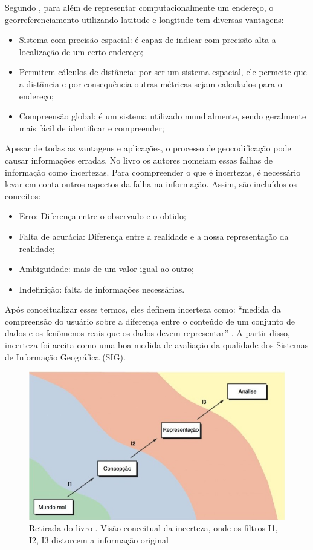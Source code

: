 Segundo \cite{longley2013}, para além de representar computacionalmente um endereço, o georreferenciamento utilizando latitude e longitude tem diversas vantagens:
\begin{itemize}
   \item Sistema com precisão espacial: é capaz de indicar com precisão alta a localização de um certo endereço;
   \item Permitem cálculos de distância: por ser um sistema espacial, ele permeite que a distância e por consequência outras métricas sejam calculados para o endereço;
   \item Compreensão global: é um sistema utilizado mundialmente, sendo geralmente mais fácil de identificar e compreender; 
\end{itemize}

Apesar de todas as vantagens e aplicações, o processo de geocodificação pode causar informações erradas. No livro \cite{longley2013} os autores nomeiam essas falhas de informação como incertezas. Para coompreender o que é incertezas, é necessário levar em conta outros aspectos da falha na informação. Assim, são incluídos os conceitos:
\begin{itemize}
   \item Erro: Diferença entre o observado e o obtido;
   \item Falta de acurácia: Diferença entre a realidade e a nossa representação da realidade;
   \item Ambiguidade: mais de um valor igual ao outro;
   \item Indefinição: falta de informações necessárias. 
\end{itemize}

Após conceitualizar esses termos, eles definem incerteza como: ``medida da compreensão do usuário sobre a diferença entre o conteúdo de um conjunto de dados e os fenômenos reais que os dados devem representar'' \cite{longley2013}. A partir disso, incerteza foi aceita como uma boa medida de avaliação da qualidade dos Sistemas de Informação Geográfica (SIG). 

\begin{figure}[h]
   \centering
   \includegraphics[width=\textwidth]{Figuras/incertezaLivro.jpeg}
   \caption{Retirada do livro \cite{longley2013}. Visão conceitual da incerteza, onde os filtros I1, I2, I3 distorcem a informação original}
   \label{fig:incerteza}
\end{figure}

